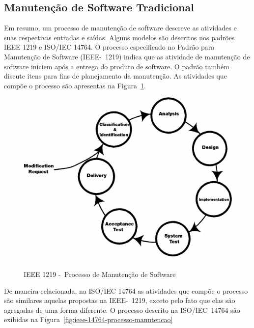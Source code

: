 \subsection{Manutenção de Software Tradicional}
\label{subsec:manutenção_de_software_tradicional}

Em resumo, um processo de manutenção de software descreve as atividades e suas
respectivas entradas e saídas. Alguns modelos são descritos nos padrões IEEE
1219 e ISO/IEC 14764. O processo especificado no Padrão para Manutenção de
Software (IEEE-~1219) indica que as atividade de manutenção de software iniciem
após a entrega do produto de software. O padrão também discute itens para fins
de planejamento da manutenção. As atividades que compõe o processo são
apresentas na Figura~\ref{fig:ieee-1219-processo-man-software}.

\begin{figure}[htpb] \centering
	\includegraphics[width=0.7\linewidth]
	{chapter-manutencao-software-visao-geral/img/ieee-1219-98-processo-manutencao.png}
	\caption{IEEE 1219 -~Processo de Manutenção de Software}\label{fig:ieee-1219-processo-man-software}
\end{figure}

De maneira relacionada, na ISO/IEC 14764 as atividades que compõe o processo são
similares aquelas propostas na IEEE-~1219, exceto pelo fato que elas são
agregadas de uma forma diferente. O processo descrito na ISO/IEC~14764 são
exibidas na Figura~\ref{fig:ieee-14764-processo-manutencao}

